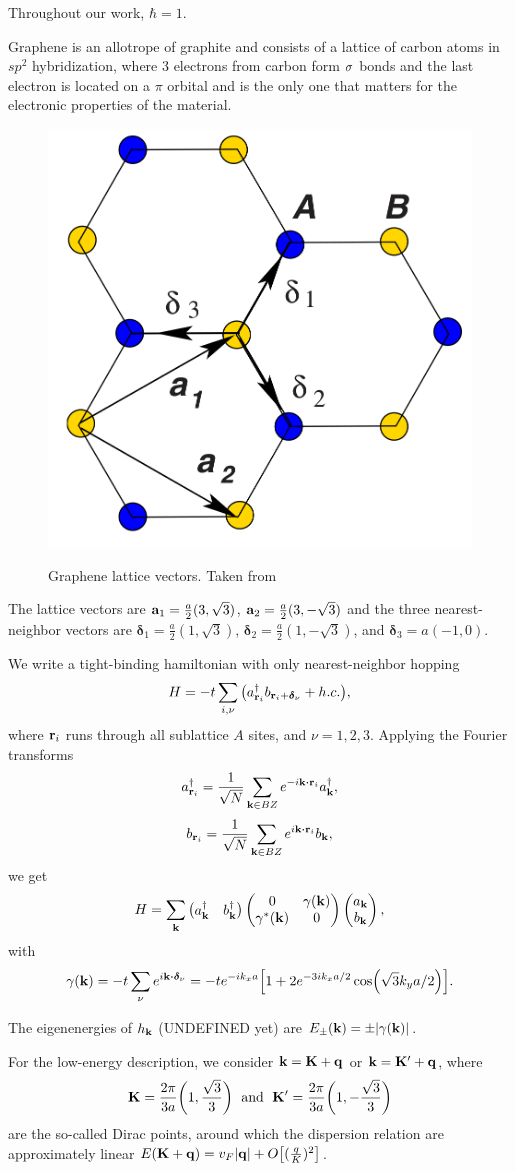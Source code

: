 \documentclass[a4paper,10pt]{article}
\begin{document}
Throughout our work, $\hbar = 1$.

\n

Graphene is an allotrope of graphite and consists of a lattice of carbon atoms in $sp^2$ hybridization, where $3$ electrons from carbon form $\sigma$ bonds and the last electron is located on a $\pi$ orbital and is the only one that matters for the electronic properties of the material.

\begin{figure}[H]
\centering
\includegraphics[width=0.3\linewidth]{fig/graphene-lattice_vectors.png}
\label{fig:graphene-lattice_vectors}
\caption{Graphene lattice vectors. Taken from \cite{graphene}}
\end{figure}

The lattice vectors are $\vb{a}_1 = \frac{a}{2} (3, \sqrt{3})$, $\vb{a}_2 = \frac{a}{2} (3, -\sqrt{3})$ and the three nearest-neighbor vectors are $\bm{\delta}_1 = \frac{a}{2} (1, \sqrt{3})$, $\bm{\delta}_2 = \frac{a}{2} (1, -\sqrt{3})$, and $\bm{\delta}_3 = a (-1, 0)$.

We write a tight-binding hamiltonian with only nearest-neighbor hopping
$$
H = -t \sum_{i,\nu} \qty(a^\dagger_{\vb{r}_i} b_{\vb{r}_i + \bm{\delta}_\nu} + h.c. ),
$$
where $\vb{r}_i$ runs through all sublattice $A$ sites, and $\nu = 1, 2, 3$. Applying the Fourier transforms
$$
a_{\r_i}^\d = \frac{1}{\sqrt{N}} \sum_{\k \in BZ} e^{-i \k \vdot \r_i} a_{\k}^\d,
$$
$$
b_{\r_i} = \frac{1}{\sqrt{N}} \sum_{\k \in BZ} e^{i \k \vdot \r_i} b_{\k},
$$
we get
$$
H = \sum_{\vb{k}}
\begin{pmatrix}
a_{\vb{k}}^\dagger & b_{\vb{k}}^\dagger
\end{pmatrix}
\begin{pmatrix}
0 & \gamma(\vb{k}) \\
\gamma^*(\vb{k}) & 0
\end{pmatrix}
\begin{pmatrix}
a_{\vb{k}} \\ b_{\vb{k}}
\end{pmatrix},
$$
with
$$
\gamma(\k) = -t \sum_{\nu} e^{i \k \vdot \bm{\delta}_\nu} =
- t e^{-i k_x a} \qty[ 1 + 2 e^{-3ik_x a / 2} \cos(\sqrt{3} k_y a / 2) ].
$$

The eigenenergies of $h_{\vb{k}}$ (UNDEFINED yet) are $E_\pm(\vb{k}) = \pm \abs{\gamma(\vb{k})}$.

For the low-energy description, we consider $\vb{k} = \vb{K} + \vb{q}$ or $\vb{k} = \vb{K}' + \vb{q}$, where
$$
\vb{K} = \frac{2\pi}{3a} \qty(1, \frac{\sqrt{3}}{3}) \; \text{ and } \;
\vb{K}' = \frac{2\pi}{3a} \qty(1, -\frac{\sqrt{3}}{3})
$$
are the so-called Dirac points, around which the dispersion relation are approximately linear $E(\vb{K} + \vb{q}) = v_F \abs{\vb{q}} + O\qty[(\frac{q}{K})^2]$.
\end{document}
